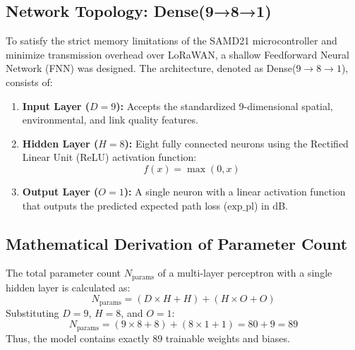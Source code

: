 \subsection{Network Topology: Dense(9→8→1)}
To satisfy the strict memory limitations of the SAMD21 microcontroller and minimize transmission overhead over LoRaWAN, a shallow Feedforward Neural Network (FNN) was designed. The architecture, denoted as Dense($9{\to}8{\to}1$), consists of:
\begin{enumerate}
    \item \textbf{Input Layer ($D=9$):} Accepts the standardized 9-dimensional spatial, environmental, and link quality features.
    \item \textbf{Hidden Layer ($H=8$):} Eight fully connected neurons using the Rectified Linear Unit (ReLU) activation function:
    \begin{equation}
        f(x) = \max(0, x)
    \end{equation}
    \item \textbf{Output Layer ($O=1$):} A single neuron with a linear activation function that outputs the predicted expected path loss ($\text{exp\_pl}$) in dB.
\end{enumerate}

\subsection{Mathematical Derivation of Parameter Count}
The total parameter count $N_{\text{params}}$ of a multi-layer perceptron with a single hidden layer is calculated as:
\begin{equation}
    N_{\text{params}} = (D \times H + H) + (H \times O + O)
\end{equation}
Substituting $D = 9$, $H = 8$, and $O = 1$:
\begin{equation}
    N_{\text{params}} = (9 \times 8 + 8) + (8 \times 1 + 1) = 80 + 9 = 89
\end{equation}
Thus, the model contains exactly 89 trainable weights and biases.

